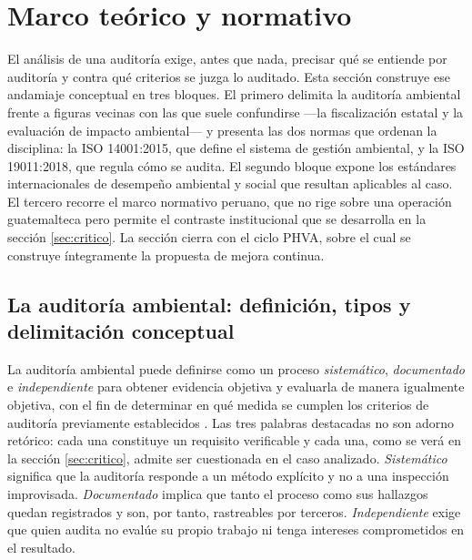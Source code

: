%

\section{Marco teórico y normativo}
\label{sec:marco}

El análisis de una auditoría exige, antes que nada, precisar qué se entiende por
auditoría y contra qué criterios se juzga lo auditado. Esta sección construye ese
andamiaje conceptual en tres bloques. El primero delimita la auditoría ambiental
frente a figuras vecinas con las que suele confundirse —la fiscalización estatal y
la evaluación de impacto ambiental— y presenta las dos normas que ordenan la
disciplina: la ISO 14001:2015, que define el sistema de gestión ambiental, y la
ISO 19011:2018, que regula cómo se audita. El segundo bloque expone los estándares
internacionales de desempeño ambiental y social que resultan aplicables al caso.
El tercero recorre el marco normativo peruano, que no rige sobre una operación
guatemalteca pero permite el contraste institucional que se desarrolla en la
sección \ref{sec:critico}. La sección cierra con el ciclo PHVA, sobre el cual se
construye íntegramente la propuesta de mejora continua.

\subsection{La auditoría ambiental: definición, tipos y delimitación conceptual}

La auditoría ambiental puede definirse como un proceso \textit{sistemático},
\textit{documentado} e \textit{independiente} para obtener evidencia objetiva y
evaluarla de manera igualmente objetiva, con el fin de determinar en qué medida se
cumplen los criterios de auditoría previamente establecidos
\parencite{iso2018iso19011}. Las tres palabras destacadas no son adorno retórico:
cada una constituye un requisito verificable y cada una, como se verá en la
sección \ref{sec:critico}, admite ser cuestionada en el caso analizado.
\textit{Sistemático} significa que la auditoría responde a un método explícito y
no a una inspección improvisada. \textit{Documentado} implica que tanto el proceso
como sus hallazgos quedan registrados y son, por tanto, rastreables por terceros.
\textit{Independiente} exige que quien audita no evalúe su propio trabajo ni tenga
intereses comprometidos en el resultado.


